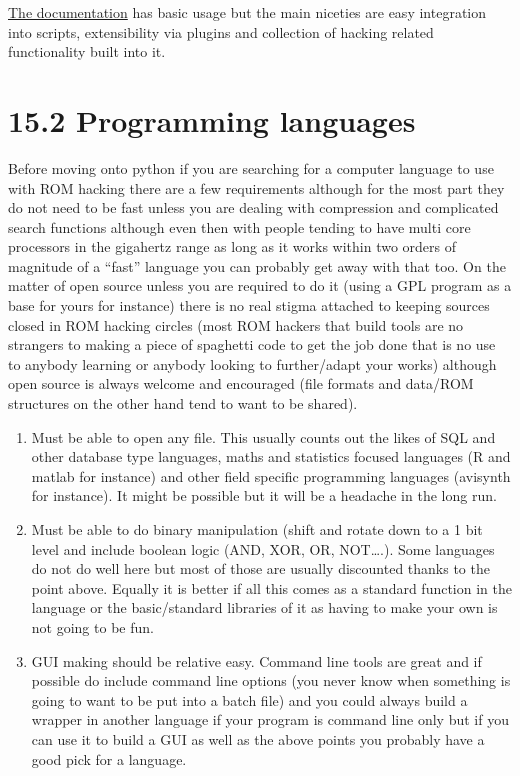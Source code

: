 \documentclass[
]{book}
\providecommand{\tightlist}{%
  \setlength{\itemsep}{0pt}\setlength{\parskip}{0pt}}
\begin{document}
\href{http://www.radare.org/y/?p=documentation}{The documentation} has basic usage but the main niceties are easy integration into scripts, extensibility via plugins and collection of hacking related functionality built into it.

\hypertarget{programming-languages}{%
\section{15.2 Programming languages}\label{programming-languages}}

Before moving onto python if you are searching for a computer language to use with ROM hacking there are a few requirements although for the most part they do not need to be fast unless you are dealing with compression and complicated search functions although even then with people tending to have multi core processors in the gigahertz range as long as it works within two orders of magnitude of a ``fast'' language you can probably get away with that too. On the matter of open source unless you are required to do it (using a GPL program as a base for yours for instance) there is no real stigma attached to keeping sources closed in ROM hacking circles (most ROM hackers that build tools are no strangers to making a piece of spaghetti code to get the job done that is no use to anybody learning or anybody looking to further/adapt your works) although open source is always welcome and encouraged (file formats and data/ROM structures on the other hand tend to want to be shared).

\begin{enumerate}
\def\labelenumi{\arabic{enumi}.}
\tightlist
\item
  Must be able to open any file. This usually counts out the likes of SQL and other database type languages, maths and statistics focused languages (R and matlab for instance) and other field specific programming languages (avisynth for instance). It might be possible but it will be a headache in the long run.
\item
  Must be able to do binary manipulation (shift and rotate down to a 1 bit level and include boolean logic (AND, XOR, OR, NOT\ldots.). Some languages do not do well here but most of those are usually discounted thanks to the point above. Equally it is better if all this comes as a standard function in the language or the basic/standard libraries of it as having to make your own is not going to be fun.
\item
  GUI making should be relative easy. Command line tools are great and if possible do include command line options (you never know when something is going to want to be put into a batch file) and you could always build a wrapper in another language if your program is command line only but if you can use it to build a GUI as well as the above points you probably have a good pick for a language.
\end{enumerate}
\end{document}
